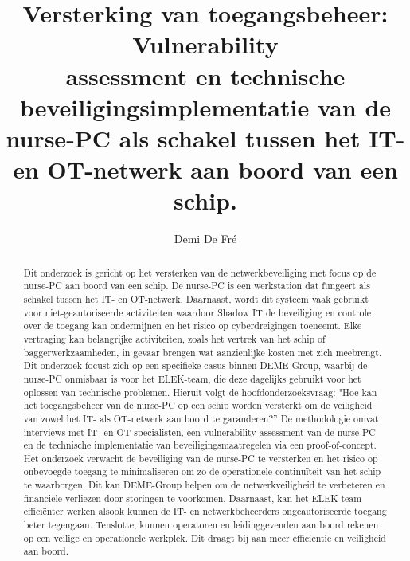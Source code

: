 \documentclass{hogent-article}
\title{Versterking van toegangsbeheer: Vulnerability \\ assessment en technische beveiligingsimplementatie van de nurse-PC als schakel tussen het IT- en OT-netwerk aan boord van een schip.}
\author{Demi De Fré}
\begin{document}
\begin{abstract}
  Dit onderzoek is gericht op het versterken van de netwerkbeveiliging met focus op de nurse-PC aan boord van een schip. 
  De nurse-PC is een werkstation dat fungeert als schakel tussen het IT- en OT-netwerk. Daarnaast, wordt dit systeem vaak gebruikt voor niet-geautoriseerde 
  activiteiten waardoor Shadow IT de beveiliging en controle over de toegang kan ondermijnen en het risico op cyberdreigingen toeneemt. Elke vertraging kan 
  belangrijke activiteiten, zoals het vertrek van het schip of baggerwerkzaamheden, in gevaar brengen wat aanzienlijke kosten met zich meebrengt. Dit onderzoek 
  focust zich op een specifieke casus binnen DEME-Group, waarbij de nurse-PC onmisbaar is voor het ELEK-team, die deze dagelijks gebruikt voor het oplossen van 
  technische problemen. Hieruit volgt de hoofdonderzoeksvraag: "Hoe kan het toegangsbeheer van de nurse-PC op een schip worden versterkt om de veiligheid van 
  zowel het IT- als OT-netwerk aan boord te garanderen?” De methodologie omvat interviews met IT- en OT-specialisten, een vulnerability assessment van de nurse-PC 
  en de technische implementatie van beveiligingsmaatregelen via een proof-of-concept. Het onderzoek verwacht de beveiliging van de nurse-PC te versterken 
  en het risico op onbevoegde toegang te minimaliseren om zo de operationele continuïteit van het schip te waarborgen. Dit kan DEME-Group helpen om de netwerkveiligheid 
  te verbeteren en financiële verliezen door storingen te voorkomen. Daarnaast, kan het ELEK-team efficiënter werken alsook kunnen de IT- en netwerkbeheerders 
  ongeautoriseerde toegang beter tegengaan. Tenslotte, kunnen operatoren en leidinggevenden aan boord rekenen op een veilige en operationele werkplek. Dit draagt bij 
  aan meer efficiëntie en veiligheid aan boord.
\end{abstract}

\tableofcontents


\printbibliography
\end{document}
